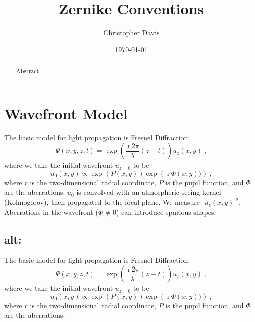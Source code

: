 \documentclass[aas_macros,preprint]{aastex}%
\renewcommand{\exp}[1]{\operatorname{exp}\left(#1\right)} %
\begin{document}
\title{ Zernike Conventions }
\author{ Christopher Davis }
\affil{}
\email{}
\date{ \today }

\maketitle

\begin{abstract}
  Abstract
\end{abstract}

\tableofcontents


\todototoc
\listoftodos




\section{Wavefront Model}

  The basic model for light propagation is Fresnel Diffraction:
  \begin{equation}
    \Psi(x, y, z, t) = \exp{\frac{\imath 2 \pi}{\lambda} (z - t)}
    u_z(x, y) \ ,
  \end{equation}
  where we take the initial wavefront $u_{z=0}$ to be
  \begin{equation}
    u_0(x,y) \propto \exp{P(x, y)} \exp{\imath \Phi(x, y))} \ ,
  \end{equation}
  where $r$ is the two-dimensional radial coordinate, $P$ is the pupil
  function, and $\Phi$ are the aberrations. $u_0$ is convolved with an
  atmospheric seeing kernel (Kolmogorov), then propagated to the focal plane.
  We measure $| u_z(x,y)|^2$. Aberrations in the wavefront ($\Phi \neq 0$)
  can introduce spurious shapes.


  \subsection{alt:}


The basic model for light propagation is Fresnel Diffraction:
\begin{equation}
  \Psi(x, y, z, t) = \exp{\frac{\imath 2 \pi}{\lambda} (z - t)}
  u_z(x, y) \ ,
\end{equation}
where we take the initial wavefront $u_{z=0}$ to be
\begin{equation}
  u_0(x,y) \propto \exp{P(x, y)} \exp{\imath \Phi(x, y))} \ ,
\end{equation}
where $r$ is the two-dimensional radial coordinate, $P$ is the pupil
function, and $\Phi$ are the aberrations.
\end{document}
